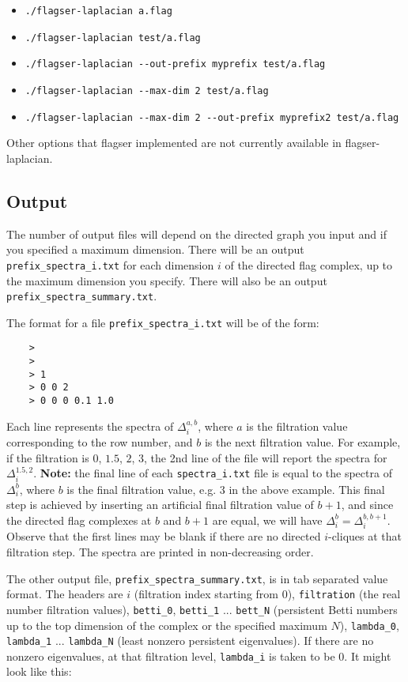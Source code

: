 \documentclass{article}
\begin{document}
\begin{itemize}
    \item \verb|./flagser-laplacian a.flag|
    \item \verb|./flagser-laplacian test/a.flag|
    \item \verb|./flagser-laplacian --out-prefix myprefix test/a.flag|
    \item \verb|./flagser-laplacian --max-dim 2 test/a.flag|
    \item \verb|./flagser-laplacian --max-dim 2 --out-prefix myprefix2 test/a.flag|
\end{itemize}

Other options that flagser implemented are not currently available in flagser-laplacian.


\subsection{Output}

The number of output files will depend on the directed graph you input and if you specified a maximum dimension. There will be an output \verb|prefix_spectra_i.txt| for each dimension $i$ of the directed flag complex, up to the maximum dimension you specify. There will also be an output \verb|prefix_spectra_summary.txt|. 

The format for a file \verb|prefix_spectra_i.txt| will be of the form:

\begin{verbatim}
    >
    > 
    > 1
    > 0 0 2
    > 0 0 0 0.1 1.0
\end{verbatim}

Each line represents the spectra of  $\Delta^{a,b}_i$, where $a$ is the filtration value corresponding to the row number, and $b$ is the next filtration value. For example, if the filtration is $0$, $1.5$, $2$, $3$, the 2nd line of the file will report the spectra for $\Delta^{1.5,2}_i$. \textbf{Note:} the final line of each \verb|spectra_i.txt| file is equal to the spectra of $\Delta^b_i$, where $b$ is the final filtration value, e.g. $3$ in the above example. This final step is achieved by inserting an artificial final filtration value of $b+1$, and since the directed flag complexes at $b$ and $b+1$ are equal, we will have $\Delta^b_i = \Delta^{b,b+1}_i$. Observe that the first lines may be blank if there are no directed $i$-cliques at that filtration step. The spectra are printed in non-decreasing order. 

The other output file, \verb|prefix_spectra_summary.txt|, is in tab separated value format. The headers are $i$ (filtration index starting from $0$), \verb|filtration| (the real number filtration values), \verb|betti_0|, \verb|betti_1| ... \verb|bett_N| (persistent Betti numbers up to the top dimension of the complex or the specified maximum $N$), \verb|lambda_0|, \verb|lambda_1| ... \verb|lambda_N| (least nonzero persistent eigenvalues). If there are no nonzero eigenvalues, at that filtration level, \verb|lambda_i| is taken to be $0$. It might look like this:
\end{document}
